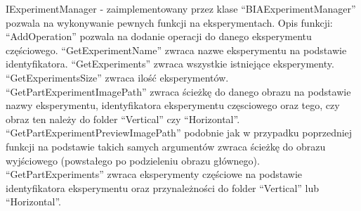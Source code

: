 \documentclass{article}
\begin{document}
            \newline\newline
            {
                \label{iexperimentmanager}
                \Large
                \justifying
                \quad
                IExperimentManager - zaimplementowany przez klase ``BIAExperimentManager'' pozwala na wykonywanie pewnych funkcji na eksperymentach.
                Opis funkcji: ``AddOperation'' pozwala na dodanie operacji do danego eksperymentu częściowego.
                ``GetExperimentName'' zwraca nazwe eksperymentu na podstawie identyfikatora.
                ``GetExperiments'' zwraca wszystkie istniejące eksperymenty.
                ``GetExperimentsSize'' zwraca ilość eksperymentów.
                ``GetPartExperimentImagePath'' zwraca ścieżkę do danego obrazu na podstawie nazwy eksperymentu, identyfikatora eksperymentu częsciowego oraz tego, czy obraz ten należy do folder ``Vertical'' czy ``Horizontal''.
                ``GetPartExperimentPreviewImagePath'' podobnie jak w przypadku poprzedniej funkcji na podstawie takich samych argumentów zwraca ścieżkę do obrazu wyjściowego (powstałego po podzieleniu obrazu głównego).
                ``GetPartExperiments'' zwraca eksperymenty częściowe na podstawie identyfikatora eksperymentu oraz przynależności do folder ``Vertical'' lub ``Horizontal''.
            }
\end{document}
